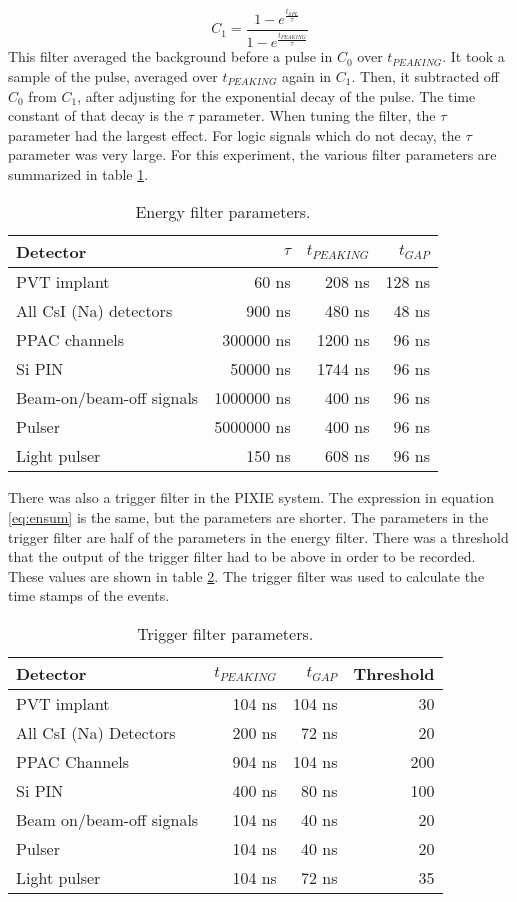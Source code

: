 \documentclass[../MaxHughesThesis.tex]{subfiles}
\begin{document}
\begin{equation}
	C_{1} = \frac{1 - e^{\frac{t_{SPL}}{\tau}}}{1 - e^{\frac{t_{PEAKING}}{\tau}}}
	\label{eq:c1sum}
\end{equation}
%
This filter averaged the background before a pulse in $C_{0}$ over $t_{PEAKING}$.
It took a sample of the pulse, averaged over $t_{PEAKING}$ again in $C_{1}$.
Then, it subtracted off $C_{0}$ from $C_{1}$, after adjusting for the exponential decay of the pulse.
The time constant of that decay is the $\tau$ parameter.
When tuning the filter, the $\tau$ parameter had the largest effect.
For logic signals which do not decay, the $\tau$ parameter was very large.
For this experiment, the various filter parameters are summarized in table \ref{tab:pixieparams}.  
%
\begin{table}[!hbt]
	\centering
	\caption{Energy filter parameters.}
		\begin{tabular}{lrrr}
			Detector & $\tau$ & $t_{PEAKING}$ & $t_{GAP}$ \\ \hline
			PVT implant & 60 ns & 208 ns & 128 ns \\
			All CsI (Na) detectors & 900 ns & 480 ns & 48 ns \\
			PPAC channels & 300000 ns & 1200 ns & 96 ns \\ 
			Si PIN & 50000 ns & 1744 ns & 96 ns \\
			Beam-on/beam-off signals & 1000000 ns & 400 ns & 96 ns \\
			Pulser & 5000000 ns & 400 ns & 96 ns \\
			Light pulser & 150 ns & 608 ns & 96 ns 
		\end{tabular}	
		\label{tab:pixieparams}
\end{table}
%
There was also a trigger filter in the PIXIE system.
The expression in equation \ref{eq:ensum} is the same, but the parameters are shorter.
The parameters in the trigger filter are half of the parameters in the energy filter.
There was a threshold that the output of the trigger filter had to be above in order to be recorded.
These values are shown in table \ref{tab:trigfilter}.
The trigger filter was used to calculate the time stamps of the events.  
%
\begin{table}[!hbt]
	\centering
	\caption{Trigger filter parameters.}
		\begin{tabular}{lrrr}
			Detector & $t_{PEAKING}$ & $t_{GAP}$ & Threshold\\ \hline
			PVT implant & 104 ns & 104 ns & 30 \\ 
			All CsI (Na) Detectors & 200 ns & 72 ns & 20 \\
			PPAC Channels & 904 ns & 104 ns & 200 \\ 
			Si PIN & 400 ns & 80 ns & 100 \\
			Beam on/beam-off signals & 104 ns & 40 ns & 20 \\
			Pulser & 104 ns & 40 ns & 20 \\
			Light pulser & 104 ns & 72 ns & 35
		\end{tabular}	
		\label{tab:trigfilter}
\end{table}
%
\end{document}
